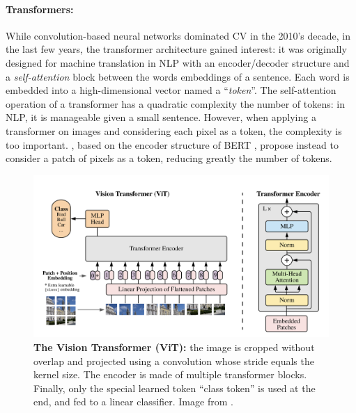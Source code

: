 \paragraph{Transformers:} While convolution-based neural networks dominated \acf{CV} in the 2010's
decade, in the last few years, the transformer architecture gained interest: it was originally
designed for machine translation in \ac{NLP} \citep{vaswani2017transformer} with an encoder/decoder
structure and a \textit{self-attention} block between the words embeddings of a sentence. Each word is
embedded into a high-dimensional vector named a ``\textit{token}''. The self-attention operation of a
transformer has a quadratic complexity \wrt the number of tokens: in \ac{NLP}, it is manageable
given a small sentence. However, when applying a transformer on images and considering each pixel
as a token, the complexity is too important. \cite{dosovitskiy2020vit}, based on the encoder
structure of BERT \citep{devlin2018bert}, propose instead to consider a patch of pixels as a token,
reducing greatly the number of tokens.

\begin{figure}[tb]
      \begin{center}
            \includegraphics[width=\linewidth]{images/related/vit.png}
      \end{center}
      \caption{\textbf{The Vision Transformer (ViT):} the image is cropped without overlap and
            projected using a convolution whose stride equals the kernel size. The encoder is made of
            multiple transformer blocks. Finally, only the special learned token ``class token'' is used
            at the end, and fed to a linear classifier. Image from \cite{dosovitskiy2020vit}.}
      \label{fig:related_vit}
\end{figure}

